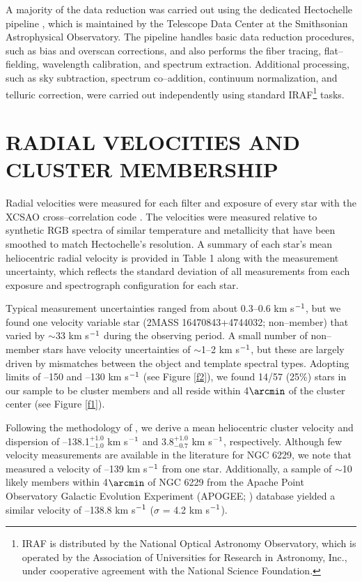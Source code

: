 \documentclass[12pt,preprint]{emulateapj}
\begin{document}
A majority of the data reduction was carried out using the dedicated 
Hectochelle pipeline \citep{Caldwell09}, which is maintained by the 
Telescope Data Center at the Smithsonian Astrophysical Observatory.  The 
pipeline handles basic data reduction procedures, such as bias and overscan
corrections, and also performs the fiber tracing, flat--fielding, wavelength
calibration, and spectrum extraction.  Additional processing, such as 
sky subtraction, spectrum co--addition, continuum normalization, and telluric
correction, were carried out independently using standard IRAF\footnote{IRAF is
distributed by the National Optical Astronomy Observatory, which is operated by
the Association of Universities for Research in Astronomy, Inc., under 
cooperative agreement with the National Science Foundation.} tasks.

\section{RADIAL VELOCITIES AND CLUSTER MEMBERSHIP}

Radial velocities were measured for each filter and exposure of every star
with the XCSAO cross--correlation code \citep{Kurtz98}.  The velocities
were measured relative to synthetic RGB spectra of similar temperature and
metallicity that have been smoothed to match Hectochelle's resolution.  A
summary of each star's mean heliocentric radial velocity is provided in 
Table 1 along with the measurement uncertainty, which reflects the standard
deviation of all measurements from each exposure and spectrograph 
configuration for each star.

Typical measurement uncertainties ranged from about 0.3--0.6 km s$^{\rm -1}$,
but we found one velocity variable star (2MASS 16470843+4744032; non--member)
that varied by $\sim$33 km s$^{\rm -1}$ during the observing period.  A small
number of non--member stars have velocity uncertainties of $\sim$1--2 km 
s$^{\rm -1}$, but these are largely driven by mismatches between the object and 
template spectral types.  Adopting limits of --150 and --130 km s$^{\rm -1}$
(see Figure \ref{f2}), we found 14/57 (25$\%$) stars in our sample to be 
cluster members and all reside within 4$\arcmin$ of the cluster center (see 
Figure \ref{f1}).
   
Following the methodology of \citet{Walker09}, we derive a mean heliocentric
cluster velocity and dispersion of --138.1$_{-1.0}^{+1.0}$ km s$^{\rm -1}$ and 
3.8$_{-0.7}^{+1.0}$ km s$^{\rm -1}$, respectively.  Although few velocity 
measurements are available in the literature for NGC 6229, we note that 
\citet{Pilachowski83} measured a velocity of --139 km s$^{\rm -1}$ from 
one star.  Additionally, a sample of $\sim$10 likely members within 4$\arcmin$
of NGC 6229 from the Apache Point Observatory Galactic Evolution 
Experiment (APOGEE; \citealt{Majewski15}) database yielded a similar velocity
of --138.8 km s$^{\rm -1}$ ($\sigma$ = 4.2 km s$^{\rm -1}$).
\end{document}
